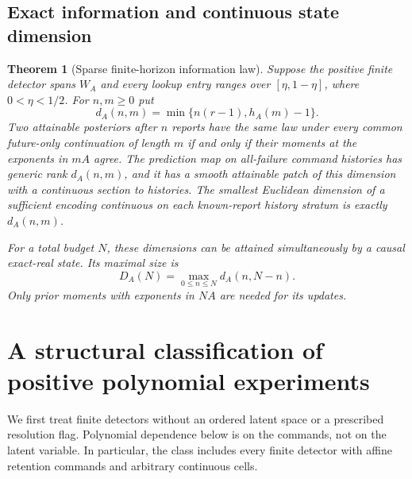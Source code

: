 \documentclass[11pt]{amsart}
\newtheorem{theorem}{Theorem}[section]
\theoremstyle{definition}\newtheorem{definition}[theorem]{Definition}
\theoremstyle{remark}\newtheorem{remark}[theorem]{Remark}
\begin{document}
\subsection{Exact information and continuous state dimension}
\begin{theorem}[Sparse finite-horizon information law]\label{thm:main}
Suppose the positive finite detector spans $W_A$ and every lookup entry
ranges over $[\eta,1-\eta]$, where $0<\eta<1/2$. For $n,m\ge0$ put
\begin{equation}\label{eq:main-dimension}
 d_A(n,m)=\min\{n(r-1),h_A(m)-1\}.
\end{equation}
Two attainable posteriors after $n$ reports have the same law under every
common future-only continuation of length $m$ if and only if their moments
at the exponents in $mA$ agree. The prediction map on all-failure command
histories has generic rank $d_A(n,m)$, and it has a smooth attainable patch
of this dimension with a continuous section to histories. The smallest
Euclidean dimension of a sufficient encoding continuous on each
known-report history stratum is exactly $d_A(n,m)$.

For a total budget $N$, these dimensions can be attained simultaneously
by a causal exact-real state. Its maximal size is
\begin{equation}\label{eq:peak}
 D_A(N)=\max_{0\le n\le N}d_A(n,N-n).
\end{equation}
Only prior moments with exponents in $NA$ are needed for its updates.
\end{theorem}

\section{A structural classification of positive polynomial experiments}
\label{sec:v18-structure}
We first treat finite detectors without an ordered latent space or a
prescribed resolution flag. Polynomial dependence below is on the commands,
not on the latent variable. In particular, the class includes every finite
detector with affine retention commands and arbitrary continuous cells.
\end{document}
